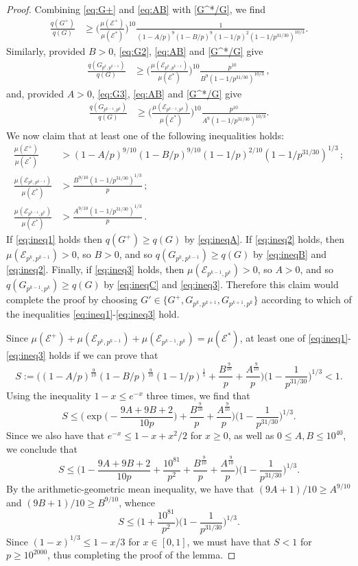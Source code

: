 \documentclass[12pt]{amsart}
\numberwithin{equation}{section}
\theoremstyle{definition}
\theoremstyle{remark}
\newcommand{\CE}{\mathcal{E}}
\newcommand{\al}[1]{\begin{align} #1 \end{align} }
\renewcommand{\le}{\leqslant}
\renewcommand{\ge}{\geqslant}
\begin{document}
\begin{proof}
Combining \eqref{eq:G+} and \eqref{eq:AB} with \eqref{G^*/G}, we find
\al{
\frac{q(G^+)}{q(G)} &\ge
	\bigg(\frac{\mu(\CE^+)}{\mu(\CE^*)}\bigg)^{10} 
	\frac{1}{(1-A/p)^{9}(1-B/p)^{9}(1-1/p)^2(1-1/p^{31/30})^{10/3}} . \label{eq:ineqA}
	}
Similarly, provided $B>0$, \eqref{eq:G2}, \eqref{eq:AB} and \eqref{G^*/G} give
\al{
\frac{q(G_{p^k,p^{k-1}})}{q(G)}& \ge
	\bigg(\frac{\mu(\CE_{p^k,p^{k-1}})}{\mu(\CE^*)}\bigg)^{10} 
		\frac{p^{10}}{B^{9}(1-1/p^{31/30})^{10/3}}  \, ,\label{eq:ineqB}
		}
		and, provided $A>0$, \eqref{eq:G3}, \eqref{eq:AB} and \eqref{G^*/G} give
		\al{
\frac{q(G_{p^{k-1},p^k})}{q(G)} &\ge
	\bigg(\frac{\mu(\CE_{p^{k-1},p^k})}{\mu(\CE^*)}\bigg)^{10} 
		\frac{p^{10}}{A^{9}(1-1/p^{31/30})^{10/3}} .\label{eq:ineqC}
}
We now claim that at least one of the following inequalities holds:
\al{
\frac{\mu(\CE^+)}{\mu(\CE^*)}	&> 
	(1-A/p)^{9/10}(1-B/p)^{9/10}(1-1/p)^{2/10}(1-1/p^{31/30})^{1/3} \,; \label{eq:ineq1}\\
\frac{\mu(\CE_{p^k,p^{k-1}})}{\mu(\CE^*)}& > 
	\frac{B^{9/10}(1-1/p^{31/30})^{1/3}}{p} \,;\label{eq:ineq2}\\
\frac{\mu(\CE_{p^{k-1},p^k})}{\mu(\CE^*)}& > 
	\frac{A^{9/10}(1-1/p^{31/30})^{1/3}}{p} \,.\label{eq:ineq3}
}
If \eqref{eq:ineq1} holds then $q(G^+)\ge q(G)$ by \eqref{eq:ineqA}. If \eqref{eq:ineq2} holds, then $\mu(\CE_{p^k,p^{k-1}})>0$, so $B>0$, and so $q(G_{p^k,p^{k-1}})\ge q(G)$ by \eqref{eq:ineqB} and \eqref{eq:ineq2}. Finally, if \eqref{eq:ineq3} holds, then $\mu(\CE_{p^{k-1},p^k})>0$, so $A>0$, and so $q(G_{p^{k-1},p^k})\ge q(G)$ by \eqref{eq:ineqC} and \eqref{eq:ineq3}. Therefore this claim would complete the proof by choosing $G'\in\{G^+,G_{p^k,p^{k+1}},G_{p^{k+1},p^k}\}$ according to which of the inequalities \eqref{eq:ineq1}-\eqref{eq:ineq3} hold.

Since $\mu(\CE^+)+\mu(\CE_{p^k,p^{k-1}})+\mu(\CE_{p^{k-1},p^k})=\mu(\CE^*)$, at least one of \eqref{eq:ineq1}-\eqref{eq:ineq3} holds if we can prove that
\[
S:= \bigg( (1-A/p)^{\frac{9}{10}}(1-B/p)^{\frac{9}{10}}(1-1/p)^{\frac{1}{5}} 
	+ \frac{B^{\frac{9}{10}}}{p} 
	+ \frac{A^{\frac{9}{10}}}{p} \bigg) \bigg(1-\frac{1}{p^{31/30}}\bigg)^{1/3} < 1. 
\]
Using the inequality $1-x\le e^{-x}$ three times, we find that
\[
S\le  \bigg( \exp\Big(-\frac{9A+9B+2}{10 p} \Big) 
	+ \frac{B^{\frac{9}{10}}}{p} 
	+ \frac{A^{\frac{9}{10}}}{p} \bigg) \bigg(1-\frac{1}{p^{31/30}}\bigg)^{1/3} .	
\]
Since we also have that $e^{-x}\le 1-x+x^2/2$ for $x\ge0$, as well as $0\le A,B\le 10^{40}$, we conclude that
\[
S\le  \bigg( 1-\frac{9A+9B+2}{10 p}+ \frac{10^{81}}{p^2} 
	+ \frac{B^{\frac{9}{10}}}{p} 
	+ \frac{A^{\frac{9}{10}}}{p} \bigg) \bigg(1-\frac{1}{p^{31/30}}\bigg)^{1/3} .	
\]
By the arithmetic-geometric mean inequality, we have that $(9A+1)/10\ge A^{9/10}$ and $(9B+1)/10\ge B^{9/10}$, whence
\[
S\le  \bigg( 1 + \frac{10^{81}}{p^2} \bigg)\bigg(1-\frac{1}{p^{31/30}}\bigg)^{1/3}.
\]
Since $(1-x)^{1/3}\le 1-x/3$ for $x\in[0,1]$, we must have that $S< 1$ for $p\ge 10^{2000}$, thus completing the proof of the lemma.
\end{proof}
\end{document}

